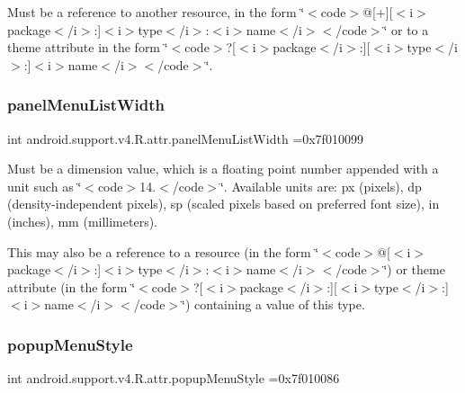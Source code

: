 Must be a reference to another resource, in the form \char`\"{}$<$code$>$@\mbox{[}+\mbox{]}\mbox{[}$<$i$>$package$<$/i$>$\+:\mbox{]}$<$i$>$type$<$/i$>$\+:$<$i$>$name$<$/i$>$$<$/code$>$\char`\"{} or to a theme attribute in the form \char`\"{}$<$code$>$?\mbox{[}$<$i$>$package$<$/i$>$\+:\mbox{]}\mbox{[}$<$i$>$type$<$/i$>$\+:\mbox{]}$<$i$>$name$<$/i$>$$<$/code$>$\char`\"{}. \mbox{\label{classandroid_1_1support_1_1v4_1_1R_1_1attr_a9c5fc64ccd77f01ff944d1df2fcc080c}} 
\subsubsection{\texorpdfstring{panel\+Menu\+List\+Width}{panelMenuListWidth}}
{\footnotesize\ttfamily int android.\+support.\+v4.\+R.\+attr.\+panel\+Menu\+List\+Width =0x7f010099\hspace{0.3cm}{\ttfamily [static]}}

Must be a dimension value, which is a floating point number appended with a unit such as \char`\"{}$<$code$>$14.\+5sp$<$/code$>$\char`\"{}. Available units are\+: px (pixels), dp (density-\/independent pixels), sp (scaled pixels based on preferred font size), in (inches), mm (millimeters). 

This may also be a reference to a resource (in the form \char`\"{}$<$code$>$@\mbox{[}$<$i$>$package$<$/i$>$\+:\mbox{]}$<$i$>$type$<$/i$>$\+:$<$i$>$name$<$/i$>$$<$/code$>$\char`\"{}) or theme attribute (in the form \char`\"{}$<$code$>$?\mbox{[}$<$i$>$package$<$/i$>$\+:\mbox{]}\mbox{[}$<$i$>$type$<$/i$>$\+:\mbox{]}$<$i$>$name$<$/i$>$$<$/code$>$\char`\"{}) containing a value of this type. \mbox{\label{classandroid_1_1support_1_1v4_1_1R_1_1attr_a10740d726841b1c76173ce62b853748a}} 
\subsubsection{\texorpdfstring{popup\+Menu\+Style}{popupMenuStyle}}
{\footnotesize\ttfamily int android.\+support.\+v4.\+R.\+attr.\+popup\+Menu\+Style =0x7f010086\hspace{0.3cm}{\ttfamily [static]}}

